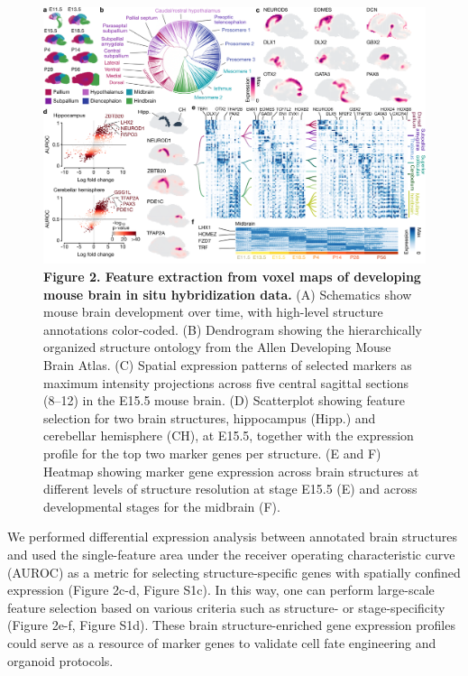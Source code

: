 \begin{figure}[t!]
    \centering
	\includegraphics[width=\textwidth]{figures/voxhunt/Figure_2}
    \caption{\textbf{Figure 2. Feature extraction from voxel maps of developing mouse brain in situ hybridization data.} (A) Schematics show mouse brain development over time, with high-level structure annotations color-coded. (B) Dendrogram showing the hierarchically organized structure ontology from the Allen Developing Mouse Brain Atlas. (C) Spatial expression patterns of selected markers as maximum intensity projections across five central sagittal sections (8–12) in the E15.5 mouse brain. (D) Scatterplot showing feature selection for two brain structures, hippocampus (Hipp.) and cerebellar hemisphere (CH), at E15.5, together with the expression profile for the top two marker genes per structure. (E and F) Heatmap showing marker gene expression across brain structures at different levels of structure resolution at stage E15.5 (E) and across developmental stages for the midbrain (F).}
    \label{fig:vox2}
\end{figure}


We performed differential expression analysis between annotated brain structures and used the single-feature area under the receiver operating characteristic curve (AUROC) as a metric for selecting structure-specific genes with spatially confined expression (Figure 2c-d, Figure S1c). In this way, one can perform large-scale feature selection based on various criteria such as structure- or stage-specificity (Figure 2e-f, Figure S1d). These brain structure-enriched gene expression profiles could serve as a resource of marker genes to validate cell fate engineering and organoid protocols.


